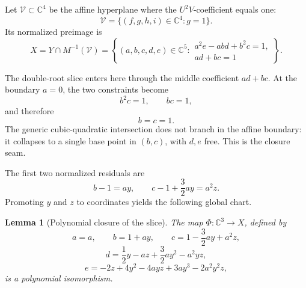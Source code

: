 \documentclass[11pt,letterpaper]{article}
\newcommand{\C}{\mathbb{C}}
\theoremstyle{jgpplain}
\newtheorem{lemma}[theorem]{Lemma}
\begin{document}
Let \(\mathcal V\subset\C^4\) be the affine hyperplane where the
\(U^2V\)-coefficient equals one:
\[
\mathcal V=\{(f,g,h,i)\in\C^4:g=1\}.
\]
Its normalized preimage is
\[
X
=Y\cap M^{-1}(\mathcal V)
=\left\{
(a,b,c,d,e)\in\C^5:
\begin{array}{l}
a^2e-abd+b^2c=1,\\
ad+bc=1
\end{array}
\right\}.
\]

The double-root slice enters here through the middle coefficient \(ad+bc\).
At the boundary \(a=0\), the two constraints become
\[
b^2c=1,\qquad bc=1,
\]
and therefore
\[
b=c=1.
\]
The generic cubic-quadratic intersection does not branch in the affine
boundary: it collapses to a single base point in \((b,c)\), with \(d,e\) free.
This is the closure seam.

The first two normalized residuals are
\[
b-1=ay,
\qquad
c-1+\frac32ay=a^2z.
\]
Promoting \(y\) and \(z\) to coordinates yields the following global chart.

\begin{lemma}[Polynomial closure of the slice]\label{lem:closure}
The map \(\Phi:\C^3\to X\), defined by
\[
a=a,\qquad
b=1+ay,\qquad
c=1-\frac32ay+a^2z,
\]
\[
d=\frac12y-az+\frac32ay^2-a^2yz,
\]
\[
e=-2z+4y^2-4ayz+3ay^3-2a^2y^2z,
\]
is a polynomial isomorphism.
\end{lemma}
\end{document}
